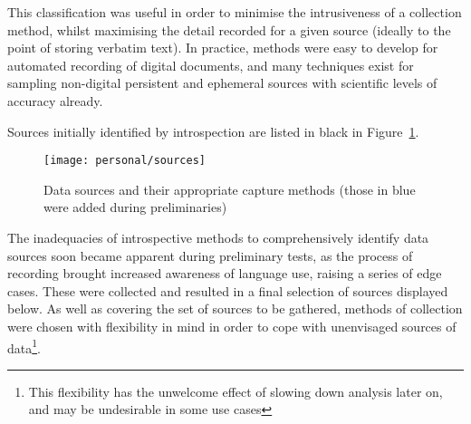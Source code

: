 This classification was useful in order to minimise the intrusiveness of a collection method, whilst maximising the detail recorded for a given source (ideally to the point of storing verbatim text).  In practice, methods were easy to develop for automated recording of digital documents, and many techniques exist for sampling non-digital persistent and ephemeral sources with scientific levels of accuracy already.

Sources initially identified by introspection are listed in black in Figure~\ref{fig:personal:datasources}.

\begin{figure}[p]
\centering
\texttt{[image: personal/sources]}
\caption{Data sources and their appropriate capture methods (those in blue were added during preliminaries)}
\label{fig:personal:datasources}
\end{figure}



The inadequacies of introspective methods to comprehensively identify data sources soon became apparent during preliminary tests, as the process of recording brought increased awareness of language use, raising a series of edge cases.  These were collected and resulted in a final selection of sources displayed below.  As well as covering the set of sources to be gathered, methods of collection were chosen with flexibility in mind in order to cope with unenvisaged sources of data\footnote{This flexibility has the unwelcome effect of slowing down analysis later on, and may be undesirable in some use cases}.



